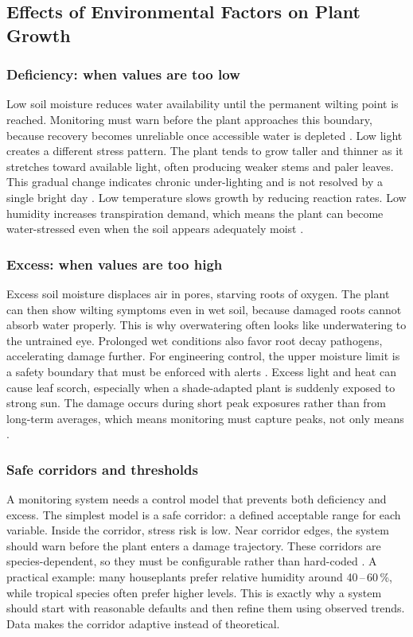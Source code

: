 \subsection{Effects of Environmental Factors on Plant Growth}

\subsubsection*{Deficiency: when values are too low}
Low soil moisture reduces water availability until the permanent wilting point is reached. Monitoring must warn before the plant approaches this boundary, because recovery becomes unreliable once accessible water is depleted \cite{cornellWiltingPoint}.
Low light creates a different stress pattern. The plant tends to grow taller and thinner as it stretches toward available light, often producing weaker stems and paler leaves. This gradual change indicates chronic under-lighting and is not resolved by a single bright day \cite{openstaxSensory}.
Low temperature slows growth by reducing reaction rates. Low humidity increases transpiration demand, which means the plant can become water-stressed even when the soil appears adequately moist \cite{blancaflor2025measuring}.
\subsubsection*{Excess: when values are too high}
Excess soil moisture displaces air in pores, starving roots of oxygen. The plant can then show wilting symptoms even in wet soil, because damaged roots cannot absorb water properly. This is why overwatering often looks like underwatering to the untrained eye. Prolonged wet conditions also favor root decay pathogens, accelerating damage further. For engineering control, the upper moisture limit is a safety boundary that must be enforced with alerts \cite{ucIpmAeration, rootRotsWisc}.
Excess light and heat can cause leaf scorch, especially when a shade-adapted plant is suddenly exposed to strong sun. The damage occurs during short peak exposures rather than from long-term averages, which means monitoring must capture peaks, not only means \cite{umdSunburn}.
\subsubsection*{Safe corridors and thresholds}
A monitoring system needs a control model that prevents both deficiency and excess. The simplest model is a safe corridor: a defined acceptable range for each variable. Inside the corridor, stress risk is low. Near corridor edges, the system should warn before the plant enters a damage trajectory. These corridors are species-dependent, so they must be configurable rather than hard-coded \cite{unhHumidity}.
A practical example: many houseplants prefer relative humidity around 40\,--\,60\,\%, while tropical species often prefer higher levels. This is exactly why a system should start with reasonable defaults and then refine them using observed trends. Data makes the corridor adaptive instead of theoretical.

